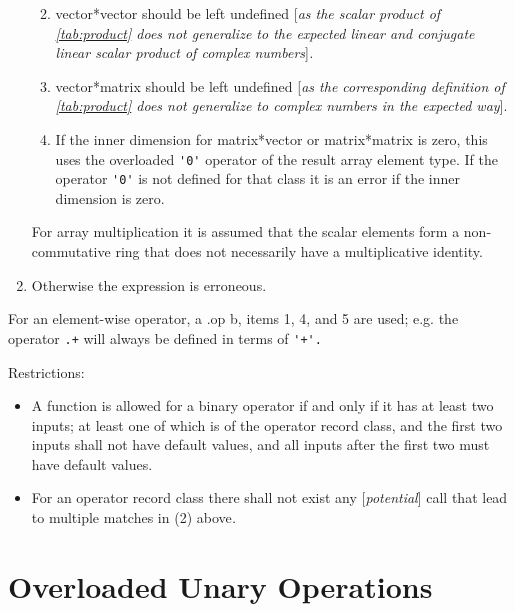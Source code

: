 \begin{enumerate}
  \begin{enumerate}
  \def\labelenumii{(\alph{enumii})}
  \item
    vector*vector should be left undefined {[}\emph{as the scalar
    product of \autoref{tab:product} does not generalize to the expected
    linear and conjugate linear scalar product of complex
    numbers}{]}\emph{.}
  \item
    vector*matrix should be left undefined {[}\emph{as the corresponding
    definition of \autoref{tab:product} does not generalize to complex
    numbers in the expected way}{]}.
  \item
    If the inner dimension for matrix*vector or matrix*matrix is zero,
    this uses the overloaded \lstinline!'0'! operator of the result array element
    type. If the operator \lstinline!'0'! is not defined for that class it is an
    error if the inner dimension is zero.
  \end{enumerate}

\begin{nonnormative}
For array multiplication it is assumed that the scalar elements
form a non-commutative ring that does not necessarily have a
multiplicative identity.
\end{nonnormative}

\item
  Otherwise the expression is erroneous.
\end{enumerate}

For an element-wise operator, a .op b, items 1, 4, and 5 are used; e.g.
the operator \lstinline!.+! will always be defined in terms of \lstinline!'+'.!

Restrictions:

\begin{itemize}
\item
  A function is allowed for a binary operator if and only if it has at
  least two inputs; at least one of which is of the operator record
  class, and the first two inputs shall not have default values, and all
  inputs after the first two must have default values.
\item
  For an operator record class there shall not exist {any}
  {[}\emph{potential}{]} call that lead to multiple matches in (2)
  above\emph{.}
\end{itemize}

\section{Overloaded Unary Operations}

